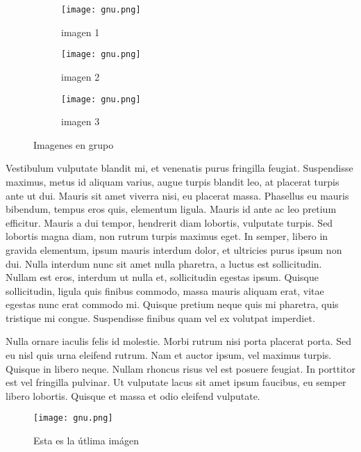 \begin{figure}
    \centering
    \begin{subfigure}[b]{0.3\textwidth}
        \centering
        \texttt{[image: gnu.png]}
        \caption{imagen 1}
        \label{fig:grupo1}
    \end{subfigure}
    \hfill
    \begin{subfigure}[b]{0.3\textwidth}
        \centering
        \texttt{[image: gnu.png]}
        \caption{imagen 2}
        \label{fig:grupo2}
    \end{subfigure}
    \hfill
    \begin{subfigure}[b]{0.3\textwidth}
        \centering
        \texttt{[image: gnu.png]}
        \caption{imagen 3}
        \label{fig:grupo3}
    \end{subfigure}
    \caption{Imagenes en grupo}
    \label{fig:Imagenes en grupo-label}
\end{figure}

Vestibulum vulputate blandit mi, et venenatis purus fringilla feugiat. Suspendisse maximus, metus id aliquam varius, augue turpis blandit leo, at placerat turpis ante ut dui. Mauris sit amet viverra nisi, eu placerat massa. Phasellus eu mauris bibendum, tempus eros quis, elementum ligula. Mauris id ante ac leo pretium efficitur. Mauris a dui tempor, hendrerit diam lobortis, vulputate turpis. Sed lobortis magna diam, non rutrum turpis maximus eget. In semper, libero in gravida elementum, ipsum mauris interdum dolor, et ultricies purus ipsum non dui. Nulla interdum nunc sit amet nulla pharetra, a luctus est sollicitudin. Nullam est eros, interdum ut nulla et, sollicitudin egestas ipsum. Quisque sollicitudin, ligula quis finibus commodo, massa mauris aliquam erat, vitae egestas nunc erat commodo mi. Quisque pretium neque quis mi pharetra, quis tristique mi congue. Suspendisse finibus quam vel ex volutpat imperdiet.

Nulla ornare iaculis felis id molestie. Morbi rutrum nisi porta placerat porta. Sed eu nisl quis urna eleifend rutrum. Nam et auctor ipsum, vel maximus turpis. Quisque in libero neque. Nullam rhoncus risus vel est posuere feugiat. In porttitor est vel fringilla pulvinar. Ut vulputate lacus sit amet ipsum faucibus, eu semper libero lobortis. Quisque et massa et odio eleifend vulputate.

\begin{wrapfigure}{r}{5cm}
\begin{center}
\texttt{[image: gnu.png]}
\caption{Esta es la útlima imágen}\label{gnuimage-label}
\end{center}
\end{wrapfigure}

